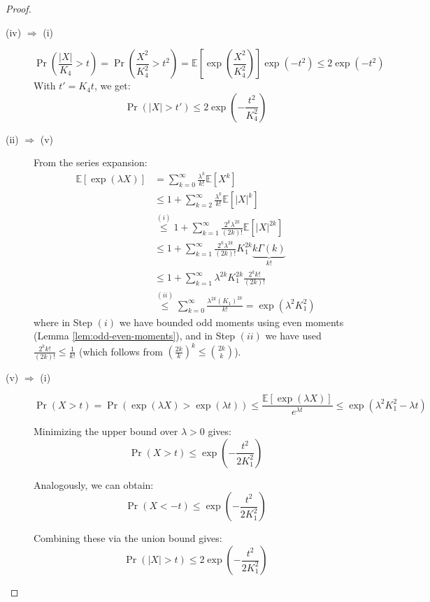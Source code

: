 \documentclass{article}
\theoremstyle{remark}
\newcommand{\Exp}{\mathbb{E}}
\begin{document}
\begin{proof}
\begin{description}
\item [(iv) \(\Rightarrow\) (i)]
\begin{equation*}
\Pr\left(\frac{|X|}{K_{4}} > t\right) = \Pr\left(\frac{X^{2}}{K_{4}^{2}} > t^{2}\right) = \Exp\left[\exp\left(\frac{X^{2}}{K_{4}^{2}}\right)\right]\exp(-t^{2}) \leq 2\exp(-t^{2})
\end{equation*}
With \(t' = K_{4}t\), we get:
\begin{equation*}
\Pr(|X| > t') \leq 2\exp\left(-\frac{t^{2}}{K_{4}^{2}}\right)
\end{equation*}

\item [(ii) \(\Rightarrow\) (v)]
From the series expansion:
\begin{align*}
\Exp[\exp(\lambda X)] &= \sum_{k=0}^{\infty}\frac{\lambda^{k}}{k!}\Exp[X^{k}] \\
&\leq 1 + \sum_{k=2}^{\infty} \frac{\lambda^{k}}{k!}\Exp[|X|^{k}] \\
&\overset{(i)}\leq 1 + \sum_{k=1}^{\infty} \frac{2^{k}\lambda^{2k}}{(2k)!}\Exp[|X|^{2k}] \\
&\leq 1 + \sum_{k=1}^{\infty} \frac{2^{k}\lambda^{2k}}{(2k)!} K_{1}^{2k}\underbrace{k\Gamma(k)}_{k!} \\
&\leq 1 + \sum_{k=1}^{\infty} \lambda^{2k}K_{1}^{2k} \frac{2^{k}k!}{(2k)!} \\
&\overset{(ii)}\leq \sum_{k=0}^{\infty} \frac{\lambda^{2k}(K_{1})^{2k}}{k!} = \exp(\lambda^{2}K_{1}^{2})
\end{align*}
where in Step \((i)\) we have bounded odd moments using even moments (Lemma \ref{lem:odd-even-moments}), and in Step \((ii)\) we have used \(\frac{2^{k}k!}{(2k)!} \leq \frac{1}{k!}\) (which follows from \(\left(\frac{2k}{k}\right)^{k} \leq \binom{2k}{k}\)).

\item [(v) \(\Rightarrow\) (i)]
\begin{equation*}
\Pr\left(X > t\right) = \Pr\left(\exp(\lambda X) > \exp(\lambda t)\right) \leq \frac{\Exp\left[\exp(\lambda X)\right]}{e^{\lambda t}} \leq \exp(\lambda^{2}K_{1}^{2} - \lambda t)
\end{equation*}

Minimizing the upper bound over \(\lambda > 0\) gives:
\begin{equation*}
\Pr\left(X > t\right) \leq \exp\left(-\frac{t^{2}}{2K_{1}^{2}}\right)
\end{equation*}

Analogously, we can obtain:
\begin{equation*}
\Pr\left(X < -t\right) \leq \exp\left(-\frac{t^{2}}{2K_{1}^{2}}\right)
\end{equation*}

Combining these via the union bound gives:
\begin{equation*}
\Pr\left(|X| > t\right) \leq 2\exp\left(-\frac{t^{2}}{2K_{1}^{2}}\right)
\end{equation*}
\end{description}
\end{proof}
\end{document}
